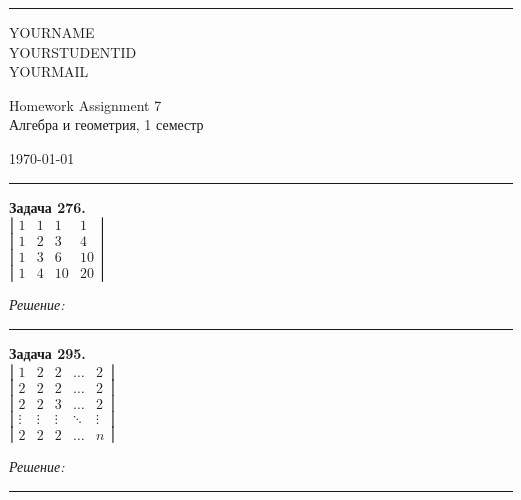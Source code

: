 \documentclass[a4paper, 12pt]{article}
\newenvironment{problem}[2][Задача]
    { \begin{mdframed}[backgroundcolor=gray!10] \textbf{#1 #2.} \\}
    {  \end{mdframed}}
\newenvironment{solution}
    {\textit{Решение: }}
    {\noindent\rule{7in}{1.5pt}}
\begin{document}

\fancyhead[C]{}
\hrule \medskip %
\begin{minipage}{0.295\textwidth} 
\raggedright\footnotesize
YOURNAME \hfill\\   
YOURSTUDENTID \hfill\\
YOURMAIL
\end{minipage}
\begin{minipage}{0.4\textwidth} 
\centering\large 
Homework Assignment 7\\ 
\normalsize 
Алгебра и геометрия, 1 семестр\\ 
\end{minipage}
\begin{minipage}{0.295\textwidth} 
\raggedleft
\today\hfill\\
\end{minipage}
\medskip\hrule 
\bigskip




\begin{problem}{276}
$\left| \begin{array}{rrrr}1 & 1 & 1 & 1 \\ 1 & 2 & 3 & 4 \\ 1 & 3 & 6 & 10 \\ 1 & 4 & 10 & 20 \end{array} \right|$
\end{problem}
\begin{solution}



\end{solution} 

\begin{problem}{295}
$\left| \begin{array}{rrrrr}1 & 2 & 2 & \ldots & 2\\ 2 & 2 & 2 & \ldots & 2 \\ 2 & 2 & 3 & \ldots & 2 \\ \vdots & \vdots & \vdots & \ddots & \vdots \\ 2 & 2 & 2 & \ldots & n \end{array} \right|$
\end{problem}
\begin{solution}



\end{solution} 
\end{document}
